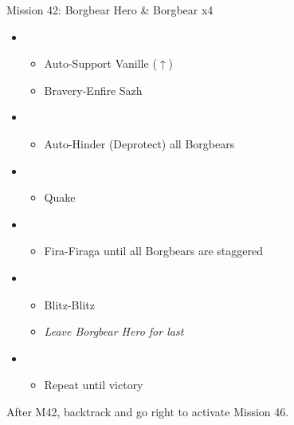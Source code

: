 \begin{battle}{Mission 42: Borgbear Hero \& Borgbear x4}
	\begin{itemize}
		\item \third
			\begin{itemize}
				\item Auto-Support Vanille ($\uparrow$)
				\item Bravery-Enfire Sazh
			\end{itemize}
		\item \second
			\begin{itemize}
				\item Auto-Hinder (Deprotect) all Borgbears
			\end{itemize}
		\item \first
			\begin{itemize}
				\item Quake
			\end{itemize}
		\item \fifth
			\begin{itemize}
				\item Fira-Firaga until all Borgbears are staggered
			\end{itemize}
		\item \first
			\begin{itemize}
				\item Blitz-Blitz
				\item \textit{Leave Borgbear Hero for last}
			\end{itemize}
		\item \fourth
			\begin{itemize}
				\item Repeat until victory
			\end{itemize}																			
	\end{itemize}
\end{battle}

After M42, backtrack and go right to activate Mission 46.

